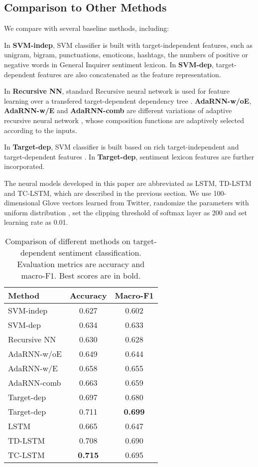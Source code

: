 \documentclass[11pt]{article}
\begin{document}
\subsection{Comparison to Other Methods}

We compare with several baseline methods, including:

In \textbf{SVM-indep}, SVM classifier is built with target-independent features, such as unigram, bigram, punctuations, emoticons, hashtags, the numbers of positive or negative words in General Inquirer sentiment lexicon. 
In \textbf{SVM-dep}, target-dependent features \cite{Jiang2011} are also concatenated as the feature representation. 

In \textbf{Recursive NN}, standard Recursive neural network is used for feature learning over a transfered target-dependent dependency tree \cite{Dong2014a}. \textbf{AdaRNN-w/oE}, \textbf{AdaRNN-w/E} and \textbf{AdaRNN-comb} are different variations of adaptive recursive neural network \cite{Dong2014a}, whose composition functions are adaptively selected according to the inputs. 

In \textbf{Target-dep}, SVM classifier is built based on rich target-independent and target-dependent features \cite{Vo2015}. In \textbf{Target-dep}, sentiment lexicon features are further incorporated. 

The neural models developed in this paper are abbreviated as LSTM, TD-LSTM and TC-LSTM, which are described in the previous section. We use 100-dimensional Glove vectors learned from Twitter, randomize the parameters with uniform distribution , set the clipping threshold of softmax layer as 200 and set learning rate as 0.01.

\begin{table}[h]
	\centering
	\begin{tabular}{l|cc}
		\hline
		Method & Accuracy & Macro-F1\\
		\hline
		SVM-indep 			& 0.627 & 0.602 \\
		SVM-dep	 			& 0.634 & 0.633 \\
		Recursive NN		& 0.630 & 0.628 \\
		AdaRNN-w/oE		 	& 0.649 & 0.644 \\
		AdaRNN-w/E	 		& 0.658 & 0.655 \\
		AdaRNN-comb			& 0.663 & 0.659 \\
		Target-dep			& 0.697 & 0.680 \\
		Target-dep 		& 0.711 & \textbf{0.699} \\
		\hline
		LSTM 				& 0.665	& 0.647	\\
		TD-LSTM				& 0.708	& 0.690 \\
		TC-LSTM				& \textbf{0.715} & 0.695\\
		\hline
	\end{tabular}
	\caption{Comparison of different methods on target-dependent sentiment classification. Evaluation metrics are accuracy and macro-F1. Best scores are in {bold}.}
	\label{table:experiment-baseline}
\end{table}
\end{document}
